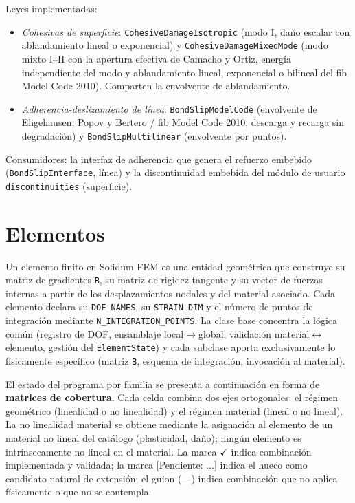 \documentclass[11pt,oneside]{report}
\begin{document}
Leyes implementadas:

\begin{itemize}
  \item \textit{Cohesivas de superficie}: \texttt{CohesiveDamageIsotropic} (modo I, daño escalar con ablandamiento lineal o exponencial) y \texttt{CohesiveDamageMixedMode} (modo mixto I--II con la apertura efectiva de Camacho y Ortiz, energía independiente del modo y ablandamiento lineal, exponencial o bilineal del fib Model Code 2010). Comparten la envolvente de ablandamiento.
  \item \textit{Adherencia-deslizamiento de línea}: \texttt{BondSlipModelCode} (envolvente de Eligehausen, Popov y Bertero / fib Model Code 2010, descarga y recarga sin degradación) y \texttt{BondSlipMultilinear} (envolvente por puntos).
\end{itemize}

Consumidores: la interfaz de adherencia que genera el refuerzo embebido (\texttt{BondSlipInterface}, línea) y la discontinuidad embebida del módulo de usuario \texttt{discontinuities} (superficie).

\section{Elementos}

Un elemento finito en Solidum FEM es una entidad geométrica que construye su matriz de gradientes \texttt{B}, su matriz de rigidez tangente y su vector de fuerzas internas a partir de los desplazamientos nodales y del material asociado. Cada elemento declara su \texttt{DOF\_NAMES}, su \texttt{STRAIN\_DIM} y el número de puntos de integración mediante \texttt{N\_\allowbreak{}INTEGRATION\_\allowbreak{}POINTS}. La clase base concentra la lógica común (registro de DOF, ensamblaje local\ensuremath{\to}global, validación material\ensuremath{\leftrightarrow}elemento, gestión del \texttt{ElementState}) y cada subclase aporta exclusivamente lo físicamente específico (matriz \texttt{B}, esquema de integración, invocación al material).

El estado del programa por familia se presenta a continuación en forma de \textbf{matrices de cobertura}. Cada celda combina dos ejes ortogonales: el régimen geométrico (linealidad o no linealidad) y el régimen material (lineal o no lineal). La no linealidad material se obtiene mediante la asignación al elemento de un material no lineal del catálogo (plasticidad, daño); ningún elemento es intrínsecamente no lineal en el material. La marca \ensuremath{\checkmark} indica combinación implementada y validada; la marca [Pendiente: ...] indica el hueco como candidato natural de extensión; el guion (---) indica combinación que no aplica físicamente o que no se contempla.
\end{document}
